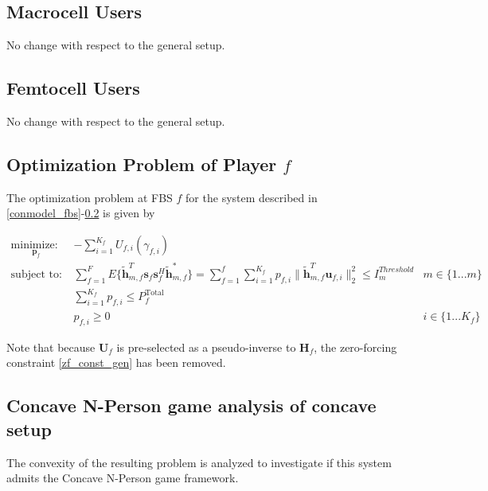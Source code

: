 \documentclass[12pt,a4paper]{report}
\begin{document}
\subsection{Macrocell Users}
No change with respect to the general setup.

\subsection{Femtocell Users}\label{conmodel_fuser}
No change with respect to the general setup.



\subsection{Optimization Problem of Player $f$}\label{conproblem}
The optimization problem at FBS $f$ for the system described in \ref{conmodel_fbs}-\ref{conmodel_fuser} is given by

	\begin{subequations}
	\label{optim}
	\begin{align}
	    \underset{\mathbf{p}_{f} }{\text{minimize: }} \;
	    & - \sum_{i=1}^{K_f}
    	U_{f,i}(\gamma_{f,i}) \label{player_opt_c} \\
	    \text{subject to: } \; &
	  \sum^F_{f=1} E\{ \mathbf{\tilde{h}}_{m,f}^T  \mathbf{s}_{f} 						
	\mathbf{s}_{f}^{H} \mathbf{\tilde{h}}_{m,f}^* \}
	=
	\sum_{f=1}^{f}	\sum_{i=1}^{K_f}
	 p_{f,i}\|\tilde{\mathbf{h}}_{m,f}^T \mathbf{u}_{f,i}\|^2_2
	\leq I^{Threshold}		
	_{m} & m \in \{1 ...m\} 
		\label{interference_const_c}\\
        & 
        	\sum_{i=1}^{K_{f}} p_{f,i}
	   \leq P_{f}^{\text{Total}}  \label{power_const_c}\\
        & p_{f,i} \geq 0 &  i\in \{1 ...K_{f}\} \label{pos_power_const_c}
	\end{align}
	\end{subequations}

Note that because $\mathbf{U}_{f}$ is pre-selected as a pseudo-inverse to  $\mathbf{H}_f$, the zero-forcing constraint \eqref{zf_const_gen} has been removed.

\subsection{Concave N-Person game analysis of concave setup}
The convexity of the resulting problem is analyzed to investigate if this system admits the Concave N-Person game framework. 
\end{document}
